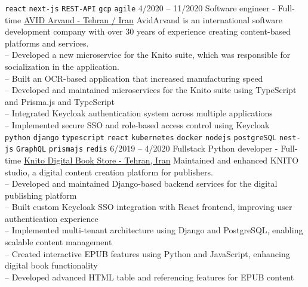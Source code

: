 \begin{entrylist}
{        \texttt{react}\slashsep
        \texttt{next-js}\slashsep
        \texttt{REST-API}\slashsep
        \texttt{gcp}\slashsep
        \texttt{agile}\slashsep
    }
    \entry
    {4/2020 -- 11/2020}
    {Software engineer - Full-time}
    {
        \href{https://www.linkedin.com/company/avid-technology-development/}{AVID Arvand - Tehran / Iran}}
    {
        AvidArvand is an international software development company with over 30 years of experience creating content-based platforms and services. \\
        -- Developed a new microservice for the Knito suite, which was responsible for socialization in the application.\\
        -- Built an OCR-based application that increased manufacturing speed \\
        -- Developed and maintained microservices for the Knito suite using TypeScript and Prisma.js and TypeScript \\
        -- Integrated Keycloak authentication system across multiple applications \\
        -- Implemented secure SSO and role-based access control using Keycloak \\
        \texttt{python}\slashsep
        \texttt{django}\slashsep
        \texttt{typescript}\slashsep
        \texttt{react}\slashsep
        \texttt{kubernetes}\slashsep
        \texttt{docker}\slashsep
        \texttt{nodejs}\slashsep
        \texttt{postgreSQL}\slashsep
        \texttt{nest-js}\slashsep
        \texttt{GraphQL}\slashsep
        \texttt{prismajs}\slashsep
        \texttt{redis}\slashsep
    }
    \entry
    {6/2019 -- 4/2020}
    {Fullstack Python developer - Full-time}
    {
        \href{https://knito.com/}{Knito Digital Book Store - Tehran, Iran}}
    {
        Maintained and enhanced KNITO studio, a digital content creation platform for publishers. \\
        -- Developed and maintained Django-based backend services for the digital publishing platform \\
        -- Built custom Keycloak SSO integration with React frontend, improving user authentication experience \\
        -- Implemented multi-tenant architecture using Django and PostgreSQL, enabling scalable content management \\
        -- Created interactive EPUB features using Python and JavaScript, enhancing digital book functionality \\
        -- Developed advanced HTML table and referencing features for EPUB content \\
}
\end{entrylist}
